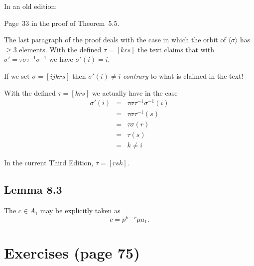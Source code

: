 \documentclass[12pt]{book}
\begin{document}
In an old edition:

Page~33 in the proof of Theorem~5.5.

The last paragraph of the proof deals with the case
in which the orbit of \(\langle\sigma\rangle\) has \(\geq3\) elements.
With the defined \(\tau = [krs]\) the text claims that
with \(\sigma' =  \tau\sigma\tau^{-1}\sigma^{-1}\) we have
\(\sigma'(i) = i\).

If we set \(\sigma = [ijkrs]\) then \(\sigma'(i)\neq i\) \emph{contrary}
to what is claimed in the text!

With the defined \(\tau = [krs]\) we actually have in the case
\begin{eqnarray}
\sigma'(i) & = & \tau\sigma\tau^{-1}\sigma^{-1}(i) \\
           & = & \tau\sigma\tau^{-1}(s) \\
           & = & \tau\sigma(r) \\
           & = & \tau(s) \\
           & = & k \neq i
\end{eqnarray}

In the current Third Edition, \(\tau = [rsk]\).

\subsection{Lemma 8.3}
The \(c\in A_1\) may be explicitly taken as
\[c = p^{k-r}\mu a_1.\]

\section{Exercises (page 75)}
\end{document}
